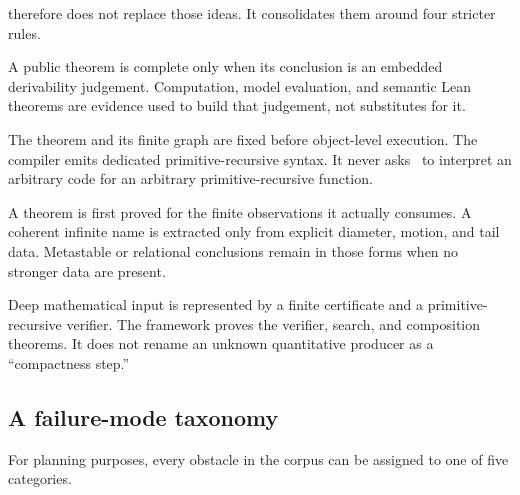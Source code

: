 \KIFC therefore does not replace those ideas.  It consolidates them around four stricter rules.

\begin{principle}
A public theorem is complete only when its conclusion is an embedded derivability judgement.  Computation, model evaluation, and semantic Lean theorems are evidence used to build that judgement, not substitutes for it.
\end{principle}

\begin{principle}
The theorem and its finite graph are fixed before object-level execution.  The compiler emits dedicated primitive-recursive syntax.  It never asks \iPRA\ to interpret an arbitrary code for an arbitrary primitive-recursive function.
\end{principle}

\begin{principle}
A theorem is first proved for the finite observations it actually consumes.  A coherent infinite name is extracted only from explicit diameter, motion, and tail data.  Metastable or relational conclusions remain in those forms when no stronger data are present.
\end{principle}

\begin{principle}
Deep mathematical input is represented by a finite certificate and a primitive-recursive verifier.  The framework proves the verifier, search, and composition theorems.  It does not rename an unknown quantitative producer as a ``compactness step.''
\end{principle}

\subsection{A failure-mode taxonomy}

For planning purposes, every obstacle in the corpus can be assigned to one of five categories.

